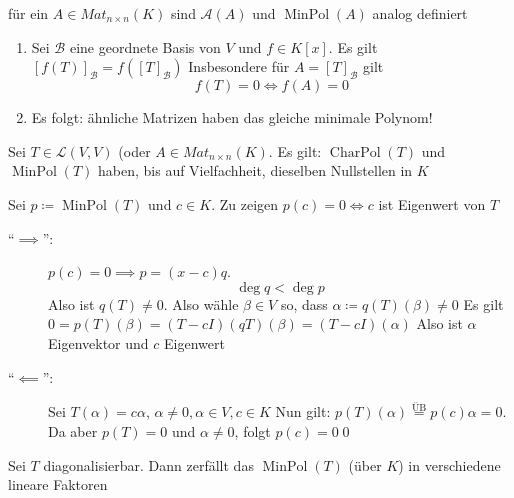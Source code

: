\begin{subdefinition}
	für ein $ A \in Mat_{n \times n} (K) $ sind $ \mathcal{A} (A) $ und $ \operatorname{Min Pol}(A) $ analog definiert
\end{subdefinition}

\begin{subnote}
	\begin{enumerate}[label=(\arabic*)]
		\item Sei $ \mathcal{B}  $ eine geordnete Basis von $ V $ und $ f \in K[x] $.
			Es gilt $ [f(T)]_{\mathcal{B} } = f\left( [T]_{\mathcal{B} }  \right)  $ 
			Insbesondere für $ A = [T]_{\mathcal{B} }  $ gilt
			\[
				f(T) = 0 \iff f(A) = 0
			\]
		\item Es folgt: ähnliche Matrizen haben das gleiche minimale Polynom!
	\end{enumerate}
\end{subnote}

\begin{subtheorem}
	Sei $ T \in \mathcal{L} (V, V) $ (oder $ A \in Mat_{n \times n} (K) $.
	Es gilt: $ \operatorname{Char Pol}(T)  $ und $ \operatorname{Min Pol}(T) $ haben, bis auf Vielfachheit, dieselben Nullstellen in $ K $
\end{subtheorem}
\begin{subproof*}
	Sei $ p \coloneqq \operatorname{Min Pol}(T) $ und $ c \in K $.
	Zu zeigen $ p(c) = 0 \iff c $ ist Eigenwert von $ T $ 
	\begin{description}
		\item[``$ \implies  $'':] $ p(c) = 0 \implies p = (x - c) q $.
			\[
				\deg q < \deg p
			\]
			Also ist $ q(T) \neq 0 $.
			Also wähle $ \beta \in V $ so, dass $ \alpha \coloneqq  q(T) (\beta) \neq 0 $ 
			Es gilt $ 0 = p(T)(\beta) = (T - cI)(qT)(\beta) = (T - cI)(\alpha) $
			Also ist $ \alpha $ Eigenvektor und $ c $ Eigenwert
		\item[``$ \impliedby  $'':] Sei $ T(\alpha) = c \alpha $, $ \alpha \neq 0, \alpha \in V, c \in K $ 
			Nun gilt: $ p(T)(\alpha) \overset{\text{ÜB} }{=} p(c) \alpha = 0 $.
			Da aber $ p(T) = 0 $ und $ \alpha \neq 0 $, folgt $ p(c) = 0 $\qed
	\end{description}
\end{subproof*}

\begin{subproposition}
	Sei $ T $ diagonalisierbar. Dann zerfällt das $ \operatorname{Min Pol}(T) $ (über $ K $) in verschiedene lineare Faktoren
\end{subproposition}


